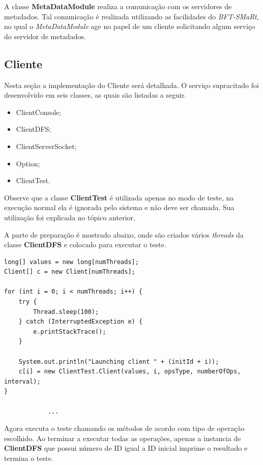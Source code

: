 A classe \textbf{MetaDataModule} realiza a comunicação com os servidores de metadados. Tal comunicação é realizada utilizando as facilidades do \textit{BFT-SMaRt}, no qual o \textit{MetaDataModule} age no papel de um cliente solicitando algum serviço do servidor de metadados.
\\

\subsection{Cliente}
Nesta seção a implementação do Cliente será detalhada. O serviço supracitado foi desenvolvido em seis classes, as quais são listadas a seguir.
\\

\begin{itemize}
	\item ClientConsole;
	\item ClientDFS;
	\item ClientServerSocket;
	\item Option;
	\item ClientTest.
\end{itemize}

Observe que a classe \textbf{ClientTest} é utilizada apenas no modo de teste, na execução normal ela é ignorada pelo sistema e não deve ser chamada. Sua utilização foi explicada no tópico anterior.

A parte de preparação é mostrado abaixo, onde são criados vários \textit{threads} da classe \textbf{ClientDFS} e colocado para executar o teste.

\begin{lstlisting}[basicstyle=\ttfamily\footnotesize, frame=single]		
long[] values = new long[numThreads];
Client[] c = new Client[numThreads];

for (int i = 0; i < numThreads; i++) {
	try {
		Thread.sleep(100);
	} catch (InterruptedException e) {
		e.printStackTrace();
	}

	System.out.println("Launching client " + (initId + i));
	c[i] = new ClientTest.Client(values, i, opsType, numberOfOps, interval);
}
	
			...
\end{lstlisting}

Agora executa o teste chamando os métodos de acordo com tipo de  operação escolhido. 
Ao terminar a executar todas as operações, apenas a instancia de \textbf{ClientDFS} que possui número de ID igual a ID inicial imprime o resultado e termina o teste.

